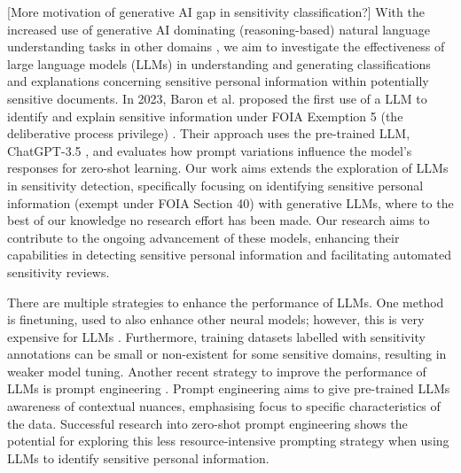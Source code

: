[More motivation of generative AI gap in sensitivity classification?]
With the increased use of generative AI dominating (reasoning-based) natural language understanding tasks in other domains \cite{qiu2020pre, adiwardana2020towards, roller2020recipes, openai2023gpt}, we aim to investigate the effectiveness of large language models (LLMs) in understanding and generating classifications and explanations concerning sensitive personal information within potentially sensitive documents. In 2023, Baron et al. proposed the first use of a LLM to identify and explain sensitive information under FOIA Exemption 5 (the deliberative process privilege) \cite{baron2023using}. Their approach uses the pre-trained LLM, ChatGPT-3.5 \cite{brown2020language}, and evaluates how prompt variations influence the model's responses for zero-shot learning. Our work aims extends the exploration of LLMs in sensitivity detection, specifically focusing on identifying sensitive personal information (exempt under FOIA Section 40) with generative LLMs, where to the best of our knowledge no research effort has been made. Our research aims to contribute to the ongoing advancement of these models, enhancing their capabilities in detecting sensitive personal information and facilitating automated sensitivity reviews.

There are multiple strategies to enhance the performance of LLMs. One method is finetuning, used to also enhance other neural models; however, this is very expensive for LLMs \cite{naveed2023comprehensive}. Furthermore, training datasets labelled with sensitivity annotations can be small or non-existent for some sensitive domains, resulting in weaker model tuning. Another recent strategy to improve the performance of LLMs is prompt engineering \cite{liu2023pre}. Prompt engineering aims to give pre-trained LLMs awareness of contextual nuances, emphasising focus to specific characteristics of the data. Successful research into zero-shot prompt engineering \cite{wei2023zero, kojima2022large} shows the potential for exploring this less resource-intensive prompting strategy when using LLMs to identify sensitive personal information.


